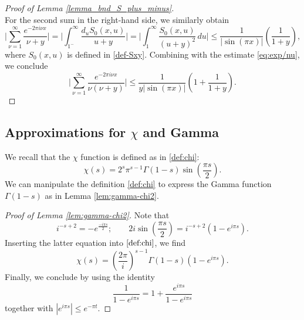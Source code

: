 \documentclass[11pt,letterpaper,oneside,reqno]{amsart}
\renewcommand{\^}[1]{\widehat{#1}}
\numberwithin{equation}{section}
\theoremstyle{remark}
\begin{document}
\begin{proof}[Proof of Lemma \ref{lemma_bnd_S_plus_minus}]
\begin{equation*}
\end{equation*}
For the second sum in the right-hand side, we similarly obtain 
\begin{equation*}
    \bigg| \sum_{\nu=1}^{\infty} \frac{e^{-2\pi i \nu x}}{\nu+y}\bigg| 
     =
    \bigg| 
\int_{1^-}^\infty \frac{d_uS_0(x,u)}{u+y}
    \bigg| 
    = 
    \bigg| 
    \int_{1}^\infty \frac{S_0(x,u)}{(u+y)^2}\, du 
    \bigg| 
    \leq 
     \frac{1}{|\sin(\pi x)|}\left(\frac{1}{1+y} \right),
\end{equation*}
where $S_0(x,u)$ is defined in \eqref{def-Sxy}. Combining with the estimate \eqref{eq:exp/nu}, we conclude 
\begin{equation*}
    \bigg| 
     \sum_{ \nu=1}^{\infty} \frac{e^{-2\pi i \nu x}}{\nu(\nu+y) } 
    \bigg|  \leq 
    \frac{1}{y|\sin(\pi x)|} \left( 1+\frac{1}{1+y} \right).
\end{equation*}
\end{proof}
%
\subsection{Approximations for $\chi$ and Gamma}
We recall that the $\chi$ function is defined as in \eqref{def:chi}:
\begin{equation}
    \chi(s) = 2^s \pi^{s-1} \Gamma(1-s) \sin\left(\frac{\pi s}{2}\right). 
\end{equation} 
We can manipulate the definition \eqref{def:chi} to express the Gamma function $\Gamma(1-s)$ as in Lemma \ref{lem:gamma-chi2}.
\begin{proof}[Proof of Lemma \ref{lem:gamma-chi2}]
     Note that 
     \[
     i^{-s+2}=-e^{\frac{-i\pi s}{2}}; \qquad 2i\sin\left(\frac{\pi s}{2} \right) = i^{-s+2}(1-e^{i\pi s}).
     \]
     Inserting the latter equation into $\eqref{def:chi}$, we find 
     \[
     \chi(s) = \left( \frac{2\pi}{i}
     \right)^{s-1}\Gamma(1-s)(1-e^{i\pi s}).
     \]
     Finally, we conclude by using the identity 
     \[
     \frac{1}{1-e^{i\pi s}} = 1+ \frac{e^{i\pi s}}{1-e^{i\pi s}} 
     \]
     together with $|e^{i\pi s}|\leq e^{-\pi t}$.
\end{proof}


\end{document}
